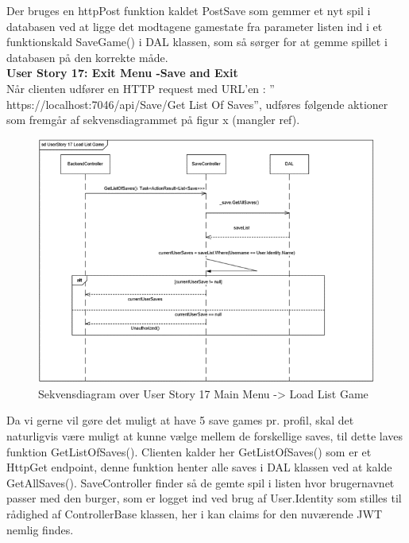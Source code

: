 Der bruges en httpPost funktion kaldet PostSave som gemmer et nyt spil i databasen ved at ligge det modtagene gamestate fra parameter listen ind i et funktionskald SaveGame() i DAL klassen, som så sørger for at gemme spillet i databasen på den korrekte måde.\\

\textbf{User Story 17: Exit Menu -\g Save and Exit}\\

Når clienten udfører en HTTP request med URL’en : ” https://localhost:7046/api/Save/Get List Of Saves”, udføres følgende aktioner som fremgår af sekvensdiagrammet på figur x (mangler ref).\\

\begin{figure}[H]
\centering
\includegraphics[width = \textwidth]{02-Body/Images/Backend_sekvens_17.PNG}
\caption{Sekvensdiagram over User Story 17 Main Menu -> Load List Game}
\label{fig:Design-Backend-Sekvens-17}
\end{figure}

Da vi gerne vil gøre det muligt at have 5 save games pr. profil, skal det naturligvis være muligt at kunne vælge mellem de forskellige saves, til dette laves funktion GetListOfSaves(). Clienten kalder her GetListOfSaves() som er et HttpGet endpoint, denne funktion henter alle saves i DAL klassen ved at kalde GetAllSaves(). SaveController finder så de gemte spil i listen hvor brugernavnet passer med den burger, som er logget ind ved brug af User.Identity som stilles til rådighed af ControllerBase klassen, her i kan claims for den nuværende JWT nemlig findes.\\

